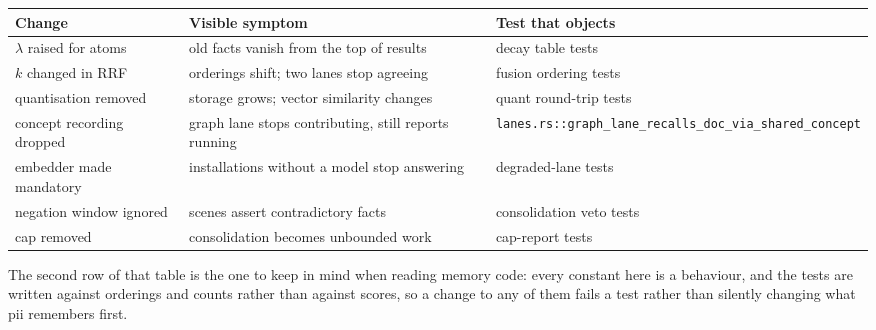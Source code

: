 \begin{longtable}{@{}p{}p{}p{}@{}}
  \toprule
  \textbf{Change} & \textbf{Visible symptom} & \textbf{Test that objects} \\
  \midrule
  \endhead
  $\lambda$ raised for atoms & old facts vanish from the top of results & decay table tests \\
  $k$ changed in RRF & orderings shift; two lanes stop agreeing & fusion ordering tests \\
  quantisation removed & storage grows; vector similarity changes & quant round-trip tests \\
  concept recording dropped & graph lane stops contributing, still reports running & \texttt{lanes.rs::graph\_lane\_recalls\_doc\_via\_shared\_concept} \\
  embedder made mandatory & installations without a model stop answering & degraded-lane tests \\
  negation window ignored & scenes assert contradictory facts & consolidation veto tests \\
  cap removed & consolidation becomes unbounded work & cap-report tests \\
  \bottomrule
\end{longtable}

The second row of that table is the one to keep in mind when reading memory code: every constant
here is a behaviour, and the tests are written against orderings and counts rather than against
scores, so a change to any of them fails a test rather than silently changing what pii remembers
first.
